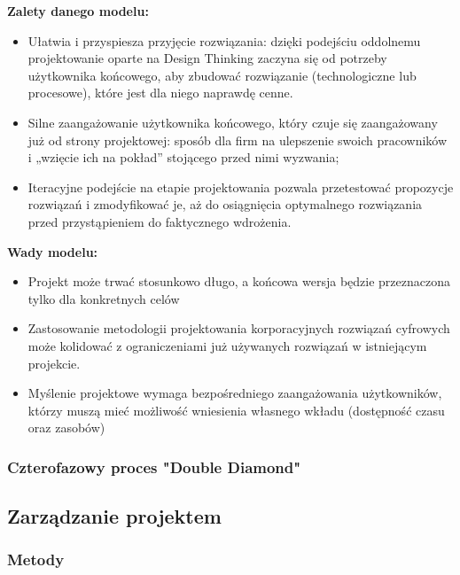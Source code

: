 \documentclass[a4paper,titleauthor]{mwart}
\begin{document}
\textbf{Zalety danego modelu:} \newline
\begin{itemize}
    \item Ułatwia i przyspiesza przyjęcie rozwiązania: dzięki podejściu oddolnemu projektowanie oparte na Design Thinking zaczyna się od potrzeby użytkownika końcowego, aby zbudować rozwiązanie (technologiczne lub procesowe), które jest dla niego naprawdę cenne.
    \item Silne zaangażowanie użytkownika końcowego, który czuje się zaangażowany już od strony projektowej: sposób dla firm na ulepszenie swoich pracowników i „wzięcie ich na pokład” stojącego przed nimi wyzwania;
    \item Iteracyjne podejście na etapie projektowania pozwala przetestować propozycje rozwiązań i zmodyfikować je, aż do osiągnięcia optymalnego  rozwiązania przed przystąpieniem do faktycznego wdrożenia.
\end{itemize}

\textbf{Wady modelu:} \newline
\begin{itemize}
	\item Projekt może trwać stosunkowo długo, a końcowa wersja będzie przeznaczona tylko dla konkretnych celów
	\item Zastosowanie metodologii projektowania korporacyjnych rozwiązań cyfrowych może kolidować z ograniczeniami już używanych rozwiązań w istniejącym projekcie.
	\item Myślenie projektowe wymaga bezpośredniego zaangażowania użytkowników, którzy muszą mieć możliwość wniesienia własnego wkładu (dostępność czasu oraz zasobów) %
\end{itemize}

 \subsubsection{Czterofazowy proces "Double Diamond"}

\subsection{Zarządzanie projektem}
\label{sec:zarządzanie_projektem}

\subsubsection{Metody}
\label{sec:narzędzia}
\end{document}
